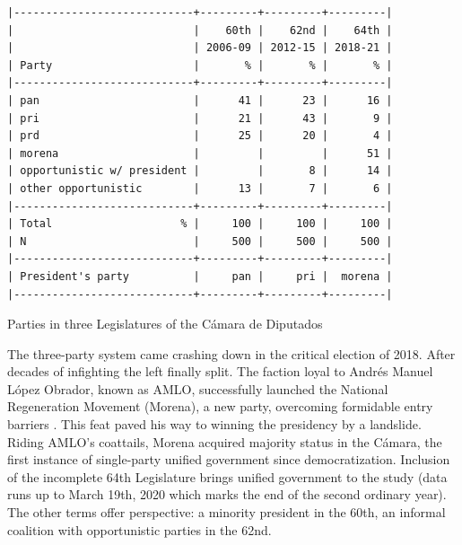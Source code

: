 \documentclass[letter,12pt]{article}
\begin{document}
\begin{table}
\begin{scriptsize}
\begin{verbatim}
|----------------------------+---------+---------+---------|
|                            |    60th |    62nd |    64th |
|                            | 2006-09 | 2012-15 | 2018-21 |
| Party                      |       % |       % |       % |
|----------------------------+---------+---------+---------|
| pan                        |      41 |      23 |      16 |
| pri                        |      21 |      43 |       9 |
| prd                        |      25 |      20 |       4 |
| morena                     |         |         |      51 |
| opportunistic w/ president |         |       8 |      14 |
| other opportunistic        |      13 |       7 |       6 |
|----------------------------+---------+---------+---------|
| Total                    % |     100 |     100 |     100 |
| N                          |     500 |     500 |     500 |
|----------------------------+---------+---------+---------|
| President's party          |     pan |     pri |  morena |
|----------------------------+---------+---------+---------|
\end{verbatim}
\end{scriptsize}
\caption{Parties in three Legislatures of the Cámara de Diputados}\label{T:seats}
\end{table}


The three-party system came crashing down in the critical election of 2018. After decades of infighting the left finally split. The faction loyal to Andrés Manuel López Obrador, known as AMLO, successfully launched the National Regeneration Movement (Morena), a new party, overcoming formidable entry barriers \citep{magar.2007ref.2015}. This feat paved his way to winning the presidency by a landslide. Riding AMLO's coattails, Morena acquired majority status in the Cámara, the first instance of single-party unified government since democratization. Inclusion of the incomplete 64th Legislature brings unified government to the study (data runs up to March 19th, 2020 which marks the end of the second ordinary year). The other terms offer perspective: a minority president in the 60th, an informal coalition with opportunistic parties in the 62nd. 
\end{document}
